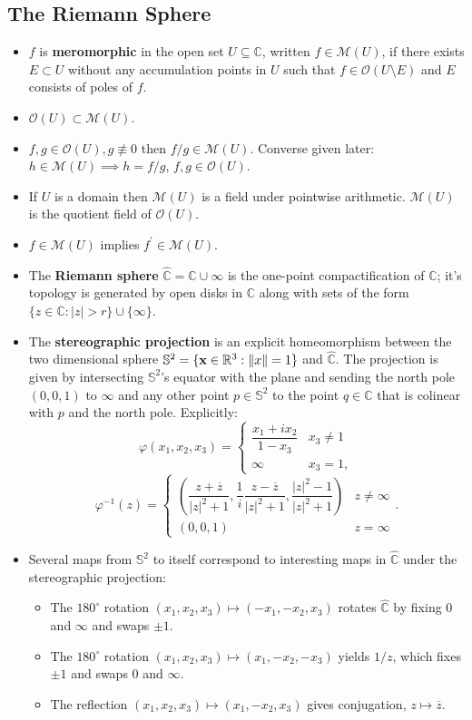 \documentclass{article}
\newenvironment{topic}[1]{%
{\subsection{#1}}%
\begin{itemize}%
}{%
\end{itemize}%
}
\newcommand{\term}[1]{{\bf #1}}
\newcommand{\holo}[1]{\mathcal{O}(#1)}
\newcommand{\mero}[1]{\mathcal{M}(#1)}
\newcommand{\remark}{\item}
\begin{document}
\begin{topic}{The Riemann Sphere}

\remark $f$ is \term{meromorphic} in the open set $U \subseteq \mathbb{C}$, written $f \in \mero{U}$, if there exists $E \subset U$ without any accumulation points in $U$ such that $f \in \holo{U \setminus E}$ and $E$ consists of poles of $f$.

\remark $\holo{U} \subset \mero{U}$.

\remark $f, g \in \holo{U}, g \not\equiv 0$ then $f / g \in \mero{U}$. Converse given later: $h \in \mero{U} \implies h = f / g$, $f, g \in \holo{U}$.

\remark If $U$ is a domain then $\mero{U}$ is a field under pointwise arithmetic. $\mero{U}$ is the quotient field of $\holo{U}$.

\remark $f \in \mero{U}$ implies $f^\prime \in \mero{U}$.

\remark The \term{Riemann sphere} $\hat{\mathbb{C}} = \mathbb{C} \cup \infty$ is the one-point compactification of $\mathbb{C}$; it's topology is generated by open disks in $\mathbb{C}$ along with sets of the form $\{z \in \mathbb{C} : |z| > r\} \cup \{\infty\}$.

\remark The \term{stereographic projection} is an explicit homeomorphism between the two dimensional sphere $\mathbb{S}^2 = \{ {\bf x} \in \mathbb{R}^3 : \|x\| = 1 \}$ and $\hat{\mathbb{C}}$. The projection is given by intersecting $\mathbb{S}^2$'s equator with the plane and sending the north pole $(0, 0, 1)$ to $\infty$ and any other point $p \in \mathbb{S}^2$ to the point $q \in \mathbb{C}$ that is colinear with $p$ and the north pole. Explicitly:$$\varphi(x_1, x_2, x_3) = \begin{cases}
\dfrac{x_1 + i x_2}{1 - x_3}&x_3 \neq 1\\[10pt]
\infty&x_3 = 1,
\end{cases}$$
$$\varphi^{-1}(z) = \begin{cases}
\left(\dfrac{z + \overline{z}}{|z|^2 + 1}, \dfrac{1}{i} \dfrac{z - \overline{z}}{|z|^2 + 1}, \dfrac{|z|^2 - 1}{|z|^2 + 1}\right)&z \neq \infty\\[10pt]
(0, 0, 1)&z = \infty
\end{cases}.$$

\remark Several maps from $\mathbb{S}^2$ to itself correspond to interesting maps in $\hat{\mathbb{C}}$ under the stereographic projection: \begin{itemize}
\item The $180^\circ$ rotation $(x_1, x_2, x_3) \mapsto (-x_1, -x_2, x_3)$ rotates $\hat{\mathbb{C}}$ by fixing $0$ and $\infty$ and swaps $\pm 1$.
\item The $180^\circ$ rotation $(x_1, x_2, x_3) \mapsto (x_1, -x_2, -x_3)$ yields $1/z$, which fixes $\pm 1$ and swaps $0$ and $\infty$.
\item The reflection $(x_1, x_2, x_3) \mapsto (x_1, -x_2, x_3)$ gives conjugation, $z \mapsto \overline{z}$.
\end{itemize}


\end{topic}
\end{document}
